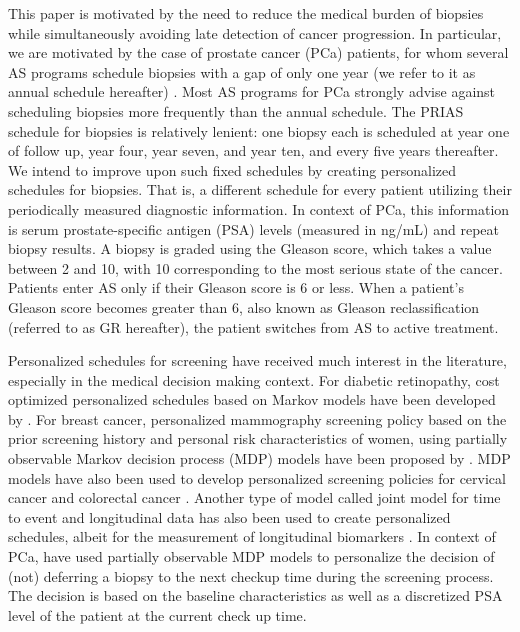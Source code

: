 This paper is motivated by the need to reduce the medical burden of biopsies while simultaneously avoiding late detection of cancer progression. In particular, we are motivated by the case of prostate cancer (PCa) patients, for whom several AS programs schedule biopsies with a gap of only one year (we refer to it as annual schedule hereafter) \citep{tosoian2011active,welty2015extended}. Most AS programs for PCa strongly advise against scheduling biopsies more frequently than the annual schedule. The PRIAS schedule for biopsies is relatively lenient: one biopsy each is scheduled at year one of follow up, year four, year seven, and year ten, and every five years thereafter. We intend to improve upon such fixed schedules by creating personalized schedules for biopsies. That is, a different schedule for every patient utilizing their periodically measured diagnostic information. In context of PCa, this information is serum prostate-specific antigen (PSA) levels (measured in ng/mL) and repeat biopsy results. A biopsy is graded using the Gleason score, which takes a value between 2 and 10, with 10 corresponding to the most serious state of the cancer. Patients enter AS only if their Gleason score is 6 or less. When a patient's Gleason score becomes greater than 6, also known as Gleason reclassification (referred to as GR hereafter), the patient switches from AS to active treatment.

Personalized schedules for screening have received much interest in the literature, especially in the medical decision making context. For diabetic retinopathy, cost optimized personalized schedules based on Markov models have been developed by \citet{bebu2017OptimalScreening}. For breast cancer, personalized mammography screening policy based on the prior screening history and personal risk characteristics of women, using partially observable Markov decision process (MDP) models have been proposed by \citet*{ayer2012or}. MDP models have also been used to develop personalized screening policies for cervical cancer \citep*{akhavan2017markov} and colorectal cancer \citep*{erenay2014optimizing}. Another type of model called joint model for time to event and longitudinal data \citep{tsiatis2004joint,rizopoulos2012joint} has also been used to create personalized schedules, albeit for the measurement of longitudinal biomarkers \citep{drizopoulosPersScreening}. In context of PCa, \citet{zhang2012optimization} have used partially observable MDP models to personalize the decision of (not) deferring a biopsy to the next checkup time during the screening process. The decision is based on the baseline characteristics as well as a discretized PSA level of the patient at the current check up time.

